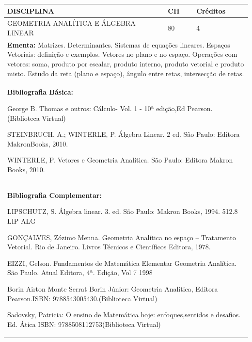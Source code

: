 \documentclass[a4paper, 12pt, openright, oneside, german, french, english, brazil]{abntex2}
\begin{document}
\begin{table}[!h]
  \footnotesize
  \centering
  \begin{tabular}{|p{100mm}|p{10mm}|p{20mm}|}
    \hline
    \textbf{DISCIPLINA} & \textbf{CH} & \textbf{Créditos} \\
    \hline
    GEOMETRIA ANALÍTICA E ÁLGEBRA LINEAR  & 80 & 4 \\
    \hline
    \multicolumn{3}{|p{130mm}|}{\textbf{Ementa:} Matrizes. Determinantes. Sistemas de equações lineares. Espaços Vetoriais: definição e exemplos. Vetores no plano e no espaço. Operações com vetores: soma, produto por escalar, produto interno, produto vetorial e produto misto. Estudo da reta (plano e espaço), ângulo entre retas, intersecção de retas. } \\
    \hline
    \multicolumn{3}{|p{130mm}|}{\textbf{Bibliografia Básica:}

    George B. Thomas e outros: Cálculo- Vol. 1 - 10ª edição,Ed Pearson. (Biblioteca Virtual)

STEINBRUCH, A.; WINTERLE, P. Álgebra Linear. 2 ed. São Paulo: Editora MakronBooks,
2010.

WINTERLE, P. Vetores e Geometria Analítica. São Paulo: Editora Makron Books, 2010.
} \\
    \hline
    \multicolumn{3}{|p{130mm}|}{\textbf{Bibliografia Complementar:}

    LIPSCHUTZ, S. Álgebra linear. 3. ed. São Paulo: Makron Books, 1994. 512.8 LIP ALG

GONÇALVES, Zózimo Menna. Geometria Analítica no espaço – Tratamento Vetorial. Rio
de Janeiro. Livros Técnicos e Científicos Editora, 1978.

EIZZI, Gelson. Fundamentos de Matemática Elementar Geometria Analítica. São Paulo.
Atual Editora, 4ª. Edição, Vol 7 1998

Borin Airton Monte Serrat Borin Júnior: Geometria Analítica, Editora Pearson.ISBN:
9788543005430.(Biblioteca Virtual)

Sadovsky, Patricia: O ensino de Matemática hoje: enfoques,sentidos e desafios. Ed. Ática
ISBN: 9788508112753(Biblioteca Virtual)
} \\
    \hline
  \end{tabular}
\end{table}
\end{document}
